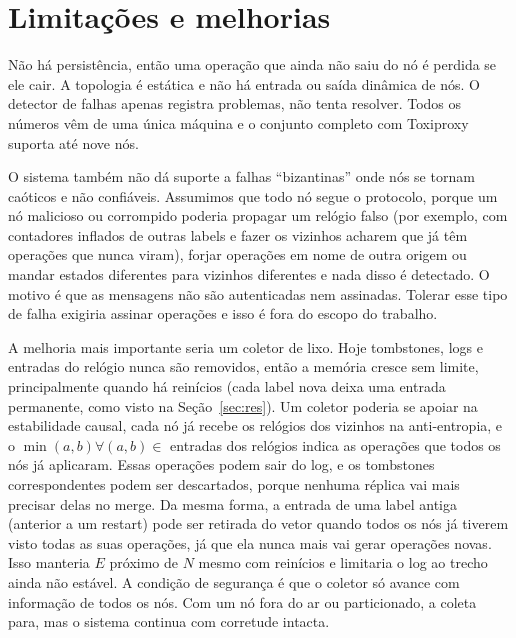 \documentclass[conference,a4paper]{IEEEtran}
\begin{document}
\section{Limitações e melhorias}\label{sec:lim}
Não há persistência, então uma operação que ainda não saiu do nó é perdida se
ele cair. A topologia é estática e não há entrada ou saída dinâmica de nós. O
detector de falhas apenas registra problemas, não tenta resolver. Todos os números vêm de uma única máquina e o conjunto completo com Toxiproxy suporta até nove nós.

O sistema também não dá suporte a falhas ``bizantinas'' onde nós se tornam caóticos e não confiáveis. Assumimos que todo nó segue o protocolo, porque um nó malicioso ou corrompido poderia propagar um relógio falso (por exemplo, com contadores inflados de outras labels e fazer os vizinhos acharem que já têm operações que nunca viram), forjar operações em nome de outra origem ou mandar estados diferentes para vizinhos diferentes e nada disso é detectado. O motivo é que as mensagens não são autenticadas nem assinadas. Tolerar esse tipo de falha exigiria assinar operações e isso é fora do escopo do trabalho.

A melhoria mais importante seria um coletor de lixo. Hoje tombstones, logs e entradas do relógio nunca são removidos, então a memória cresce sem limite, principalmente quando há reinícios (cada label nova deixa uma entrada permanente, como visto na Seção~\ref{sec:res}). Um coletor poderia se apoiar na estabilidade causal, cada nó já recebe os relógios dos vizinhos na anti-entropia, e o $\min(a, b) \forall (a, b) \in$ entradas dos relógios indica as operações que todos os nós já aplicaram. Essas operações podem sair do log, e os tombstones correspondentes podem ser descartados,
porque nenhuma réplica vai mais precisar delas no merge. Da mesma forma,
a entrada de uma label antiga (anterior a um restart) pode ser retirada
do vetor quando todos os nós já tiverem visto todas as suas operações, já
que ela nunca mais vai gerar operações novas. Isso manteria $E$ próximo de $N$
mesmo com reinícios e limitaria o log ao trecho ainda não estável. A
condição de segurança é que o coletor só avance com informação de
todos os nós. Com um nó fora do ar ou particionado, a coleta para,
mas o sistema continua com corretude intacta.
\end{document}
